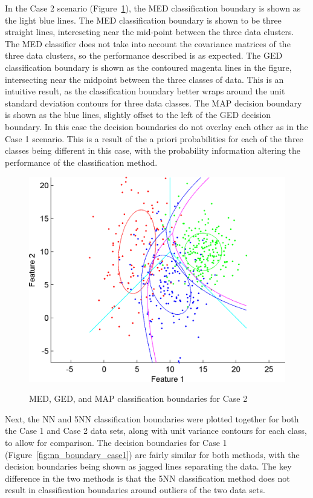 \documentclass[article, 1.5space, letterpaper, 12pt, oneside, header, footer]{SydeClass}
\begin{document}
In the Case 2 scenario (Figure~\ref{fig:med_ged_map_classifier_case2}), the MED classification boundary is shown as the light blue lines. The MED classification boundary is shown to be three straight lines, interescting near the mid-point between the three data clusters. The MED classifier does not take into account the covariance matrices of the three data clusters, so the performance described is as expected. The GED classification boundary is shown as the contoured magenta lines in the figure, intersecting near the midpoint between the three classes of data. This is an intuitive result, as the classification boundary better wraps around the unit standard deviation contours for three data classes. The MAP decision boundary is shown as the blue lines, slightly offset to the left of the GED decision boundary. In this case the decision boundaries do not overlay each other as in the Case 1 scenario. This is a result of the a priori probabilities for each of the three classes being different in this case, with the probability information altering the performance of the classification method.

\begin{figure}[ht]
\centering
	{
	\includegraphics[width=0.45\linewidth]{fig2b-AB_MED_MICD_MAP}
	}
	
	\caption{MED, GED, and MAP classification boundaries for Case 2}
	\label{fig:med_ged_map_classifier_case2}
\end{figure}

Next, the NN and 5NN classification boundaries were plotted together for both the Case 1 and Case 2 data sets, along with unit variance contours for each class, to allow for comparison. The decision boundaries for Case 1 (Figure~\ref{fig:nn_boundary_case1}) are fairly similar for both methods, with the decision boundaries being shown as jagged lines separating the data. The key difference in the two methods is that the 5NN classification method does not result in classification boundaries around outliers of the two data sets.
\end{document}
